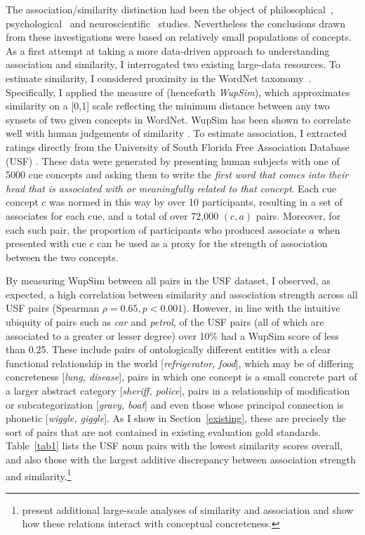 The association/similarity distinction had been the object of philosophical~\citep{grigg2009lacan}, psychological~\citep{crutch2009different} and neuroscientific~\citep{lucas2000semantic} studies. Nevertheless the conclusions drawn from these investigations were based on relatively small populations of concepts. As a first attempt at taking a more data-driven approach to understanding association and similarity, I interrogated two existing large-data resources. To estimate similarity, I considered proximity in the WordNet taxonomy~\citep{fellbaum1999wordnet}. Specifically, I applied the measure of \cite{wu1994verbs} (henceforth \emph{WupSim}), which approximates similarity on a [0,1] scale reflecting the minimum distance between any two synsets of two given concepts in WordNet. WupSim has been shown to correlate well with human judgements of similarity \citep{wu1994verbs}. To estimate association, I extracted ratings directly from the University of South Florida Free Association Database (USF) \citep{nelson2004university}. These data were generated by presenting human subjects with one of 5000 cue concepts and asking them to write the \emph{first word that comes into their head that is associated with or meaningfully related to that concept}. Each cue concept \( c \) was normed in this way by over 10 participants, resulting in a set of associates for each cue, and a total of over 72,000 \((c,a)\) pairs. Moreover, for each such pair, the proportion of participants who produced associate \(a\) when presented with cue \(c\) can be used as a proxy for the strength of association between the two concepts.

By measuring WupSim between all pairs in the USF dataset, I observed, as expected, a high correlation between similarity and association strength across all USF pairs (Spearman \( \rho= 0.65, p<0.001 \)). However, in line with the intuitive ubiquity of pairs such as \emph{car} and \emph{petrol}, of the USF pairs (all of which are associated to a greater or lesser degree) over 10\% had a WupSim score of less than 0.25. These include pairs of ontologically different entities with a clear functional relationship in the world [\emph{refrigerator, food}], which may be of differing concreteness [\emph{lung, disease}], pairs in which one concept is a small concrete part of a larger abstract category [\emph{sheriff, police}], pairs in a relationship of modification or subcategorization [\emph{gravy, boat}] and even those whose principal connection is phonetic [\emph{wiggle, giggle}]. As I show in Section~\ref{existing}, these are precisely the sort of pairs that are not contained in existing evaluation gold standards. Table~\ref{tab1} lists the USF noun pairs with the lowest similarity scores overall, and also those with the largest additive discrepancy between association strength and similarity.\footnote{\cite{hill2013quantitative} present additional large-scale analyses of similarity and association and show how these relations interact with conceptual concreteness.} 

